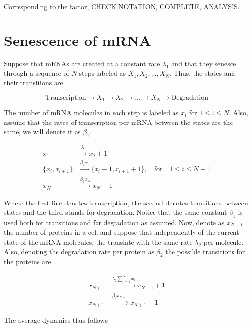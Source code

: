 Corresponding to the factor, CHECK NOTATION, COMPLETE, ANALYSIS.

\section{Senescence of mRNA}

Suppose that mRNAs are created at a constant rate $\lambda_1$ and that they senesce through a sequence of $N$ steps labeled as $X_1,X_2,\dotsc,X_N$. Thus, the states and their transitions are

\begin{equation}
  \text{Transcription} \rightarrow X_1 \rightarrow X_2 \rightarrow \dots \rightarrow X_N \rightarrow \text{Degradation}
\end{equation}

The number of mRNA molecules in each step is labeled as $x_i$ for $1\leq i\leq N$. Also, assume that the rates of transcription per mRNA between the states are the same, we will denote it as $\beta_1$.

\begin{equation}
  \begin{split}
    x_1&\xrightarrow{\lambda_1}x_1+1\\
    \{x_i,x_{i+1}\}&\xrightarrow{\beta_1x_i} \{x_i-1,x_{i+1}+1\},\quad \text{for}\quad1\leq i\leq N-1\\
    x_N&\xrightarrow{\beta_1x_N} x_N-1
  \end{split}
\end{equation}

Where the first line denotes transcription, the second denotes transitions between states and the third stands for degradation. Notice that the same constant $\beta_1$ is used both for transitions and for degradation as assumed. Now, denote as $x_{N+1}$ the number of proteins in a cell and suppose that independently of the current state of the mRNA molecules, the translate with the same rate $\lambda_2$ per molecule. Also, denoting the degradation rate per protein as $\beta_2$ the possible transitions for the proteins are

\begin{equation}
  \begin{split}
    x_{N+1} &\xrightarrow{\lambda_2\sum_{i=1}^Nx_i} x_{N+1}+1\\
    x_{N+1} &\xrightarrow{\beta_2x_{N+1}}x_{N+1}-1
  \end{split}
\end{equation}

The average dynamics thus follows


